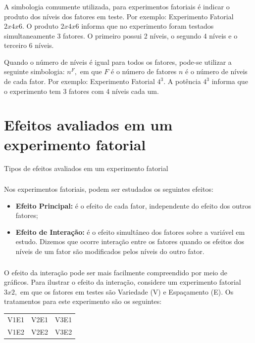 \documentclass[14pt,aspectratio=1610]{beamer}
\begin{document}
\begin{frame}{}
\frametitle{}
\begin{block}{}
\justifying
A simbologia comumente utilizada, para experimentos fatoriais é indicar
o produto dos níveis dos fatores em teste. Por exemplo: Experimento Fatorial
$2x4x6.$ O produto $2x4x6$ informa que no experimento foram testados
simultaneamente 3 fatores. O primeiro possui 2 níveis, o segundo 4 níveis e o
terceiro 6 níveis.
\end{block}
\pause
\begin{block}{}
\justifying
Quando o número de níveis é igual para todos os fatores, pode-se utilizar a seguinte simbologia: $n^{F},$ em que $F$ é o número de fatores $n$ é o número de níveis de cada fator. Por exemplo: Experimento Fatorial $4^{3}.$ A potência $4^{3}$ informa que o experimento tem 3 fatores com 4 níveis cada um.
\end{block}
\end{frame}

\section{Efeitos avaliados em um experimento fatorial}
\begin{frame}{Tipos de efeitos avaliados em um experimento fatorial}
\frametitle{}
\begin{block}{}
\justifying
Nos experimentos fatoriais, podem ser estudados os seguintes efeitos:
\begin{itemize}
\item {\bf Efeito Principal:} é o efeito de cada fator, independente do efeito dos
outros fatores;\pause
\item {\bf Efeito de Interação:} é o efeito simultâneo dos fatores sobre a variável
em estudo. Dizemos que ocorre interação entre os fatores quando os efeitos
dos níveis de um fator são modificados pelos níveis do outro fator.
\end{itemize}
\end{block}
\end{frame}

\begin{frame}{}
\frametitle{}
\begin{block}{}
\justifying
O efeito da interação pode ser mais facilmente compreendido por meio
de gráficos. Para ilustrar o efeito da interação, considere um experimento
fatorial $3x2,$ em que os fatores em testes são Variedade (V) e Espaçamento
(E). Os tratamentos para este experimento são os seguintes:
\begin{table}[!h]
\begin{tabular}{ccc}
V1E1&V2E1&V3E1\\
V1E2&V2E2&V3E2
\end{tabular}
\end{table}
\end{block}
\end{frame}
\end{document}
